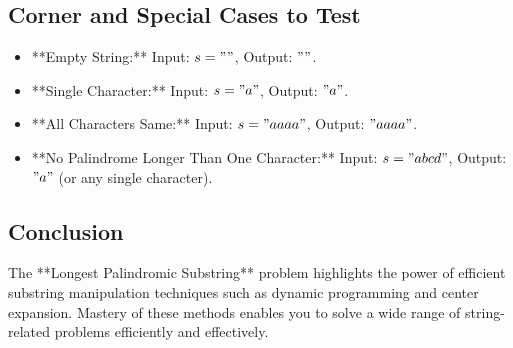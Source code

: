 \subsection*{Corner and Special Cases to Test}
\begin{itemize}
    \item **Empty String:** Input: \(s = ""\), Output: \( "" \).
    \item **Single Character:** Input: \(s = "a"\), Output: \( "a" \).
    \item **All Characters Same:** Input: \(s = "aaaa"\), Output: \( "aaaa" \).
    \item **No Palindrome Longer Than One Character:** Input: \(s = "abcd"\), Output: \( "a" \) (or any single character).
\end{itemize}

\subsection*{Conclusion}
The **Longest Palindromic Substring** problem highlights the power of efficient substring manipulation techniques such as dynamic programming and center expansion. Mastery of these methods enables you to solve a wide range of string-related problems efficiently and effectively.